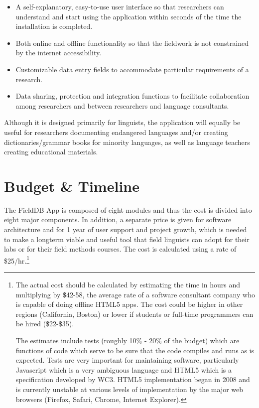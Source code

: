 \documentclass[12 pt]{article}
\begin{document}
\begin{itemize} 
\item A self-explanatory, easy-to-use user interface so that researchers can understand and start using the application  within seconds of  the time the installation is completed.  
\item Both online and offline functionality so that the fieldwork is not constrained by the internet accessibility. 
\item Customizable data entry fields to accommodate particular requirements of a research.  
\item Data sharing, protection and integration functions to facilitate collaboration among researchers and between researchers and language consultants. 

\end{itemize} 


Although it is designed primarily for linguists, the application will equally be useful for researchers documenting endangered languages and/or creating dictionaries/grammar books for minority languages, as well as language teachers creating educational materials.  





\section {Budget \& Timeline}

The FieldDB App is composed of eight modules and thus the cost is divided into eight major components. In addition, a separate price is given for software architecture and for 1 year of user support and project growth, which is needed to make a longterm viable and useful tool that field linguists can adopt for their labs or for their field methods courses. The cost is calculated using a rate of \$25/hr.\footnote{The actual cost should be calculated by estimating the time in hours and multiplying by \$42-58, the average rate of a software consultant company who is capable of doing offline HTML5 apps. The cost could be higher in other regions (California, Boston) or lower if students or full-time programmers can be hired (\$22-\$35).  

The  estimates include tests (roughly 10\% - 20\% of the budget) which are functions of code which serve to be sure that the code compiles and runs as is expected. Tests are very important for maintaining software, particularly Javascript which is a very ambiguous language and HTML5 which is a specification developed by WC3. HTML5 implementation  began in 2008 and is currently unstable at various levels of implementation by the major web browsers (Firefox, Safari, Chrome, Internet Explorer).}
\end{document}
